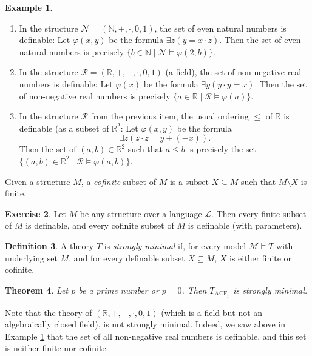 \documentclass[a4paper]{memoir}
\newtheorem{theorem}{Theorem}[section]
\theoremstyle{definition}
\newtheorem{definition}[theorem]{Definition}
\newtheorem{exercise}[theorem]{Exercise}
\newtheorem{example}[theorem]{Example}
\newcommand{\bb}{\mathbb}
\newcommand{\mc}{\mathcal}
\begin{document}
\begin{example} \label{example: definable}
\begin{enumerate}
  \item In the structure $\mc{N} = (\bb{N}, +, \cdot, 0, 1)$, the set of even natural numbers 
  is definable: Let $\varphi(x,y)$ be the formula $\exists z ( y = x \cdot z)$. Then 
  the set of even natural numbers is precisely $\{b \in \bb{N} \mid \mc{N} \models 
  \varphi(2,b)\}$.
  \item In the structure $\mc{R} = (\bb{R}, +, -, \cdot, 0, 1)$ (a field), the set of non-negative 
  real numbers is definable: Let $\varphi(x)$ be the formula $\exists y ( y \cdot y = x)$. 
  Then the set of non-negative real numbers is precisely $\{a \in \bb{R} \mid \mc{R} \models 
  \varphi(a)\}$.
  \item In the structure $\mc{R}$ from the previous item, the usual ordering $\leq$ of 
  $\bb{R}$ is definable (as a subset of $\bb{R}^2$: Let $\varphi(x,y)$ be the formula
  \[
    \exists z (z \cdot z = y + (-x)).
  \]
  Then the set of $(a,b) \in \bb{R}^2$ such that $a \leq b$ is precisely the set
  $\{(a,b) \in \bb{R}^2 \mid \mc{R} \models \varphi(a,b)\}$.
\end{enumerate}
\end{example}

Given a structure $M$, a \emph{cofinite} subset of $M$ is a subset $X \subseteq M$ such 
that $M \setminus X$ is finite.

\begin{exercise} \label{exercise: finite_cofinite}
  Let $M$ be any structure over a language $\mc{L}$. Then every finite subset of $M$ is 
  definable, and every cofinite subset of $M$ is definable (with parameters).
\end{exercise}

\begin{definition}
  A theory $T$ is \emph{strongly minimal} if, for every model $\mc{M} \models T$ with underlying 
  set $M$, and for every definable subset $X \subseteq M$, $X$ is either finite or cofinite.
\end{definition}

\begin{theorem} \label{thm: strongly_minimal}
  Let $p$ be a prime number or $p = 0$. Then $T_{\mathrm{ACF}_p}$ is strongly minimal.
\end{theorem}

Note that the theory of $(\bb{R}, +, -, \cdot, 0, 1)$ (which is a field but not an algebraically 
closed field), is not strongly minimal. Indeed, we saw above in Example \ref{example: definable} 
that the set of all non-negative real numbers is definable, and this set is neither 
finite nor cofinite.
\end{document}

